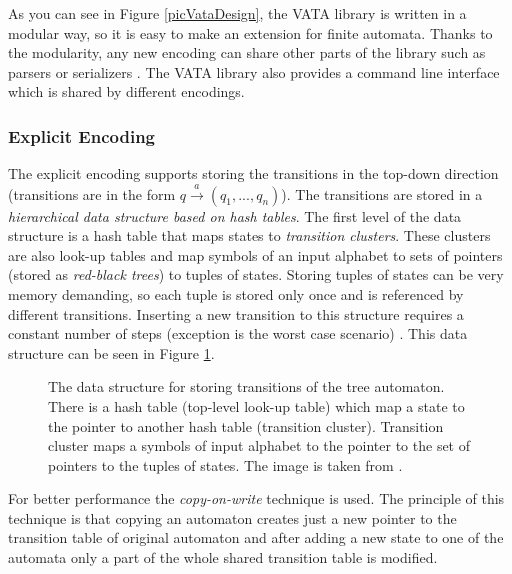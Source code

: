 As you can see in Figure \ref{picVataDesign}, the VATA library is written in a modular way, so it is easy to make an extension for finite automata. 
Thanks to the modularity, any new encoding can share other parts of the library such as parsers or serializers \cite{libvata}. 
The VATA library also provides a command line interface which is shared by different encodings.

\subsubsection{Explicit Encoding}
\label{sectionExplicitEnc}
The explicit encoding supports storing the transitions in the top-down direction (transitions are in the form $q \xrightarrow{a} (q_1,...,q_n)$). The transitions
are stored in a \emph{hierarchical data structure based on hash tables}. The first level of the data structure is a hash table
that maps states to \emph{transition clusters}. These clusters are also look-up tables and map symbols of an input alphabet
to sets of pointers (stored as \emph{red-black trees}) to tuples of states. Storing tuples of states can be very memory demanding, so each tuple is stored
only once and is referenced by different transitions. 
Inserting a new transition to this structure requires a constant number of steps (exception is the worst case scenario) %
\cite{libvata}. This data structure can be seen in Figure \ref{figExplicitTreeDataStr}.

\begin{figure}[bt]
\begin{center}

    \caption{The data structure for storing transitions of the tree automaton. There is a hash table (top-level look-up table) 
      which map a state to the pointer to another hash table (transition cluster). Transition cluster
      maps a symbols of input alphabet to the pointer to the set of pointers to the tuples of states. The image is taken from \cite{libvata}.}
		\label{figExplicitTreeDataStr}
\end{center}
\end{figure}


For better performance the \emph{copy-on-write} technique \cite{libvata} is used. The principle of this technique is 
that copying an automaton creates just a new pointer to the transition table of original automaton and after adding a new state to one of the automata 
only a part of the whole shared transition table is modified. 

